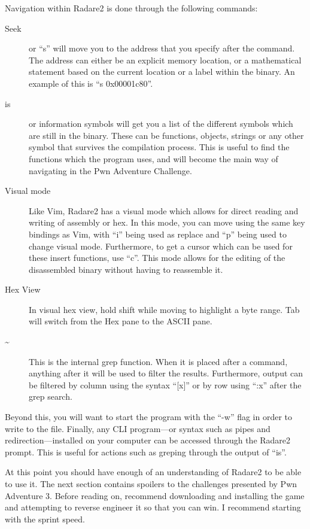 			Navigation within Radare2 is done through the following commands:
			\begin{description}
				\item[Seek]
					or ``s'' will move you to the address that you specify after the command. 
					The address can either be an explicit memory location, or a mathematical statement based on the current location or a label within the binary. 
					An example of this is ``s 0x00001c80''.
				\item[is]
					or information symbols will get you a list of the different symbols which are still in the binary. 
					These can be functions, objects, strings or any other symbol that survives the compilation process. 
					This is useful to find the functions which the program uses, and will become the main way of navigating in the Pwn Adventure Challenge. 
				\item[Visual mode]
					Like Vim, Radare2 has a visual mode which allows for direct reading and writing of assembly or hex. 
					In this mode, you can move using the same key bindings as Vim, with ``i'' being used as replace and ``p'' being used to change visual mode. 
					Furthermore, to get a cursor which can be used for these insert functions, use ``c''.
					This mode allows for the editing of the disassembled binary without having to reassemble it. 
				\item[Hex View]
					In visual hex view, hold shift while moving to highlight a byte range. 
					Tab will switch from the Hex pane to the ASCII pane. 
				\item[\~{}]
					This is the internal grep function. 
					When it is placed after a command, anything after it will be used to filter the results. 
					Furthermore, output can be filtered by column using the syntax ``[x]'' or by row using ``:x'' after the grep search.
			\end{description}
			Beyond this, you will want to start the program with the ``-w'' flag in order to write to the file. 
			Finally, any CLI program---or syntax such as pipes and redirection---installed on your computer can be accessed through the Radare2 prompt. 
			This is useful for actions such as greping through the output of ``is''. 

			At this point you should have enough of an understanding of Radare2 to be able to use it. 
			The next section contains spoilers to the challenges presented by Pwn Adventure 3. 
			Before reading on, recommend downloading and installing the game and attempting to reverse engineer it so that you can win. 
			I recommend starting with the sprint speed. 
